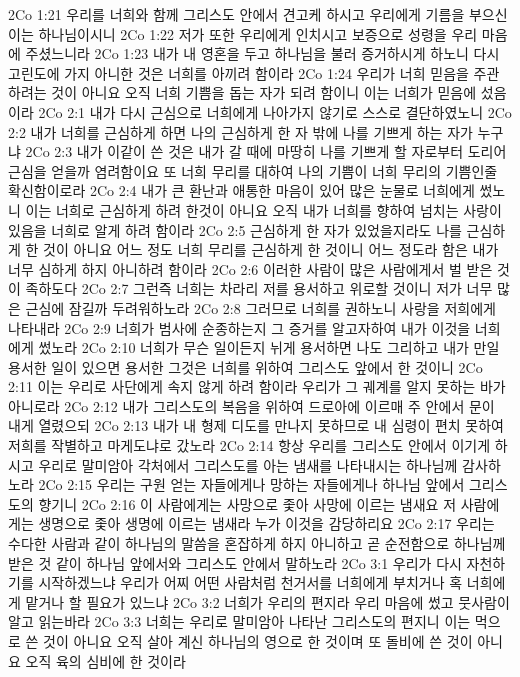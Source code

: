 2Co 1:21  우리를 너희와 함께 그리스도 안에서 견고케 하시고 우리에게 기름을 부으신 이는 하나님이시니
2Co 1:22  저가 또한 우리에게 인치시고 보증으로 성령을 우리 마음에 주셨느니라
2Co 1:23  내가 내 영혼을 두고 하나님을 불러 증거하시게 하노니 다시 고린도에 가지 아니한 것은 너희를 아끼려 함이라
2Co 1:24  우리가 너희 믿음을 주관하려는 것이 아니요 오직 너희 기쁨을 돕는 자가 되려 함이니 이는 너희가 믿음에 섰음이라
2Co 2:1  내가 다시 근심으로 너희에게 나아가지 않기로 스스로 결단하였노니
2Co 2:2  내가 너희를 근심하게 하면 나의 근심하게 한 자 밖에 나를 기쁘게 하는 자가 누구냐
2Co 2:3  내가 이같이 쓴 것은 내가 갈 때에 마땅히 나를 기쁘게 할 자로부터 도리어 근심을 얻을까 염려함이요 또 너희 무리를 대하여 나의 기쁨이 너희 무리의 기쁨인줄 확신함이로라
2Co 2:4  내가 큰 환난과 애통한 마음이 있어 많은 눈물로 너희에게 썼노니 이는 너희로 근심하게 하려 한것이 아니요 오직 내가 너희를 향하여 넘치는 사랑이 있음을 너희로 알게 하려 함이라
2Co 2:5  근심하게 한 자가 있었을지라도 나를 근심하게 한 것이 아니요 어느 정도 너희 무리를 근심하게 한 것이니 어느 정도라 함은 내가 너무 심하게 하지 아니하려 함이라
2Co 2:6  이러한 사람이 많은 사람에게서 벌 받은 것이 족하도다
2Co 2:7  그런즉 너희는 차라리 저를 용서하고 위로할 것이니 저가 너무 많은 근심에 잠길까 두려워하노라
2Co 2:8  그러므로 너희를 권하노니 사랑을 저희에게 나타내라
2Co 2:9  너희가 범사에 순종하는지 그 증거를 알고자하여 내가 이것을 너희에게 썼노라
2Co 2:10  너희가 무슨 일이든지 뉘게 용서하면 나도 그리하고 내가 만일 용서한 일이 있으면 용서한 그것은 너희를 위하여 그리스도 앞에서 한 것이니
2Co 2:11  이는 우리로 사단에게 속지 않게 하려 함이라 우리가 그 궤계를 알지 못하는 바가 아니로라
2Co 2:12  내가 그리스도의 복음을 위하여 드로아에 이르매 주 안에서 문이 내게 열렸으되
2Co 2:13  내가 내 형제 디도를 만나지 못하므로 내 심령이 편치 못하여 저희를 작별하고 마게도냐로 갔노라
2Co 2:14  항상 우리를 그리스도 안에서 이기게 하시고 우리로 말미암아 각처에서 그리스도를 아는 냄새를 나타내시는 하나님께 감사하노라
2Co 2:15  우리는 구원 얻는 자들에게나 망하는 자들에게나 하나님 앞에서 그리스도의 향기니
2Co 2:16  이 사람에게는 사망으로 좇아 사망에 이르는 냄새요 저 사람에게는 생명으로 좇아 생명에 이르는 냄새라 누가 이것을 감당하리요
2Co 2:17  우리는 수다한 사람과 같이 하나님의 말씀을 혼잡하게 하지 아니하고 곧 순전함으로 하나님께 받은 것 같이 하나님 앞에서와 그리스도 안에서 말하노라
2Co 3:1  우리가 다시 자천하기를 시작하겠느냐 우리가 어찌 어떤 사람처럼 천거서를 너희에게 부치거나 혹 너희에게 맡거나 할 필요가 있느냐
2Co 3:2  너희가 우리의 편지라 우리 마음에 썼고 뭇사람이 알고 읽는바라
2Co 3:3  너희는 우리로 말미암아 나타난 그리스도의 편지니 이는 먹으로 쓴 것이 아니요 오직 살아 계신 하나님의 영으로 한 것이며 또 돌비에 쓴 것이 아니요 오직 육의 심비에 한 것이라
